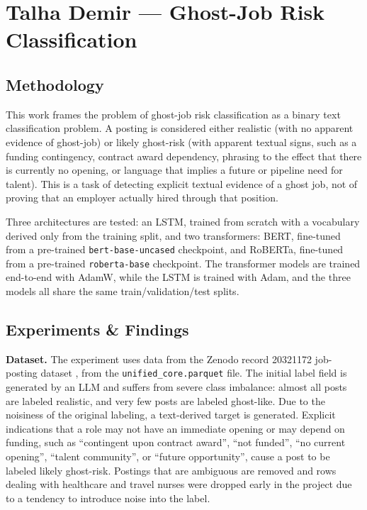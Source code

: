 \documentclass[a4paper,12pt]{report}
\begin{document}
\chapter{Talha Demir --- Ghost-Job Risk Classification}

\section{Methodology}
This work frames the problem of ghost-job risk classification as a binary text classification problem. A posting is considered either realistic (with no apparent evidence of ghost-job) or likely ghost-risk (with apparent textual signs, such as a funding contingency, contract award dependency, phrasing to the effect that there is currently no opening, or language that implies a future or pipeline need for talent). This is a task of detecting explicit textual evidence of a ghost job, not of proving that an employer actually hired through that position.

Three architectures are tested: an LSTM, trained from scratch with a vocabulary derived only from the training split, and two transformers: BERT, fine-tuned from a pre-trained \texttt{bert-base-uncased} checkpoint, and RoBERTa, fine-tuned from a pre-trained \texttt{roberta-base} checkpoint. The transformer models are trained end-to-end with AdamW, while the LSTM is trained with Adam, and the three models all share the same train/validation/test splits.
\newpage

\section{Experiments \& Findings}
\textbf{Dataset.} The experiment uses data from the Zenodo record 20321172 job-posting dataset \cite{zenodoGhostJobs}, from the \texttt{unified\_core.parquet} file. The initial label field is generated by an LLM and suffers from severe class imbalance: almost all posts are labeled realistic, and very few posts are labeled ghost-like. Due to the noisiness of the original labeling, a text-derived target is generated. Explicit indications that a role may not have an immediate opening or may depend on funding, such as ``contingent upon contract award'', ``not funded'', ``no current opening'', ``talent community'', or ``future opportunity'', cause a post to be labeled likely ghost-risk. Postings that are ambiguous are removed and rows dealing with healthcare and travel nurses were dropped early in the project due to a tendency to introduce noise into the label.
\end{document}
